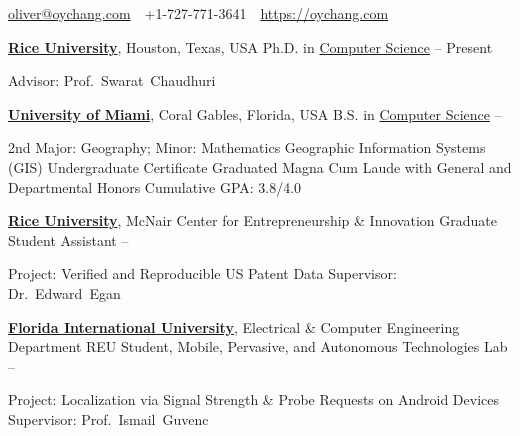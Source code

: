 \documentclass[letterpaper,MMMyyyy,nonstopmode]{simpleresumecv}
\newcommand{\CVAuthor}{Oliver Chang}
\newcommand{\CVWebpage}{https://oychang.com}
\begin{document}

\Title{\CVAuthor}

\begin{SubTitle}
\href{mailto:oliver@oychang.com}{oliver@oychang.com}
\,\SubBulletSymbol\,
+1-727-771-3641
\,\SubBulletSymbol\,
\href{\CVWebpage}
{\url{\CVWebpage}}
\end{SubTitle}

\begin{Body}



\Entry
\href{http://www.rice.edu/}{\textbf{Rice University}},
Houston, Texas, USA
\Gap
\BulletItem
Ph.D. in \href{http://www.cs.rice.edu/}{Computer Science}
\hfill
{} -- Present
\begin{Detail}
\SubBulletItem Advisor: Prof.~Swarat~Chaudhuri
\end{Detail}

\BigGap

\Entry
\href{http://welcome.miami.edu/}{\textbf{University of Miami}},
Coral Gables, Florida, USA
\Gap
\BulletItem
B.S. in \href{http://www.as.miami.edu/csc/}{Computer Science}
\hfill
{} -- 
\begin{Detail}
\SubBulletItem 2nd Major: Geography; Minor: Mathematics
\SubBulletItem Geographic Information Systems (GIS) Undergraduate Certificate
\SubBulletItem Graduated Magna Cum Laude with General and Departmental Honors
\SubBulletItem Cumulative GPA: 3.8/4.0
\end{Detail}



\Entry
\href{http://www.rice.edu/}{\textbf{Rice University}}, McNair Center for Entrepreneurship \& Innovation
\Gap
\BulletItem Graduate Student Assistant
\hfill {} -- 
\begin{Detail}
\SubBulletItem
Project: Verified and Reproducible US Patent Data
\SubBulletItem
Supervisor: Dr.~Edward~Egan
\end{Detail}

\Entry
\href{http://www.fiu.edu/}{\textbf{Florida International University}}, Electrical \& Computer Engineering Department
\Gap
\BulletItem REU Student, Mobile, Pervasive, and Autonomous Technologies Lab
\hfill {} -- 
\begin{Detail}
\SubBulletItem
Project: Localization via Signal Strength \& Probe Requests on Android Devices
\SubBulletItem
Supervisor: Prof.~Ismail~Guvenc
\end{Detail}


\end{Body}
\end{document}
